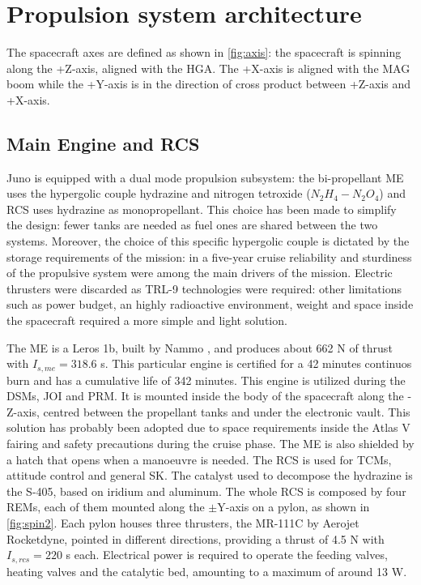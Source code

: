 \section{Propulsion system architecture}
\label{sec:prop_architecture}


The spacecraft axes are defined as shown in \autoref{fig:axis}: the spacecraft is spinning along the +Z-axis, aligned with the HGA. The +X-axis is aligned with the MAG boom while the +Y-axis is in the direction of cross product between +Z-axis and +X-axis.


\subsection{Main Engine and RCS}
\label{subsec:me_rcs}

Juno is equipped with a dual mode propulsion subsystem: the bi-propellant ME uses the hypergolic couple hydrazine and nitrogen tetroxide ($N_2H_4 - N_2O_4$) and RCS uses hydrazine as monopropellant. This choice has been made to simplify the design: fewer tanks are needed as fuel ones are shared between the two systems. Moreover, the choice of this specific hypergolic couple is dictated by the storage requirements of the mission: in a five-year cruise reliability and sturdiness of the propulsive system were among the main drivers of the mission. Electric thrusters were discarded as TRL-9 technologies were required: other limitations such as power budget, an highly radioactive environment, weight and space inside the spacecraft required a more simple and light solution. 
 
The ME is a Leros 1b, built by Nammo \cite{Leros}, and produces about 662 N of thrust with $I_{s,me} = 318.6$ s. This particular engine is certified for a 42 minutes continuos burn and has a cumulative life of 342 minutes.  This engine is utilized during the DSMs, JOI and PRM. It is mounted inside the body of the spacecraft along the -Z-axis, centred between the propellant tanks and under the electronic vault. This solution has probably been adopted due to space requirements inside the Atlas V fairing and safety precautions during the cruise phase. The ME is also shielded by a hatch that opens when a manoeuvre is needed.
The RCS is used for TCMs, attitude control and general SK. The catalyst used to decompose the hydrazine is the S-405, based on iridium and aluminum\cite{s405}.
The whole RCS is composed by four REMs, each of them mounted along the $\pm$Y-axis on a pylon, as shown in \autoref{fig:spin2}. Each pylon houses three thrusters, the MR-111C by Aerojet Rocketdyne\cite{RCS_info}, pointed in different directions, providing a thrust of 4.5 N with $I_{s,rcs} = 220$ s each. Electrical power is required to operate the feeding valves, heating valves and the catalytic bed, amounting to a maximum of around 13 W\cite{RCS_values}. 

